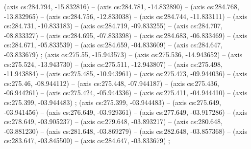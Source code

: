     (axis cs:284.794,    -15.832816) --  (axis cs:284.781,    -14.832890) --  (axis cs:284.768,    -13.832965) --  (axis cs:284.756,    -12.833038) --  (axis cs:284.744,    -11.833111) --  (axis cs:284.731,    -10.833183) --  (axis cs:284.719,    -09.833255) --  (axis cs:284.707,    -08.833327) --  (axis cs:284.695,    -07.833398) --  (axis cs:284.683,    -06.833469) --  (axis cs:284.671,    -05.833539) --  (axis cs:284.659,    -04.833609) --  (axis cs:284.647,    -03.833679) ;
    (axis cs:275.55,    -15.943573) --  (axis cs:275.536,    -14.943652) --  (axis cs:275.524,    -13.943730) --  (axis cs:275.511,    -12.943807) --  (axis cs:275.498,    -11.943884) --  (axis cs:275.485,    -10.943961) --  (axis cs:275.473,    -09.944036) --  (axis cs:275.46,    -08.944112) --  (axis cs:275.448,    -07.944187) --  (axis cs:275.436,    -06.944261) --  (axis cs:275.424,    -05.944336) --  (axis cs:275.411,    -04.944410) --  (axis cs:275.399,    -03.944483) ;
    (axis cs:275.399,    -03.944483) --  (axis cs:275.649,    -03.941456) --  (axis cs:276.649,    -03.929361) --  (axis cs:277.649,    -03.917286) --  (axis cs:278.649,    -03.905237) --  (axis cs:279.648,    -03.893217) --  (axis cs:280.648,    -03.881230) --  (axis cs:281.648,    -03.869279) --  (axis cs:282.648,    -03.857368) --  (axis cs:283.647,    -03.845500) --  (axis cs:284.647,    -03.833679) ;
  